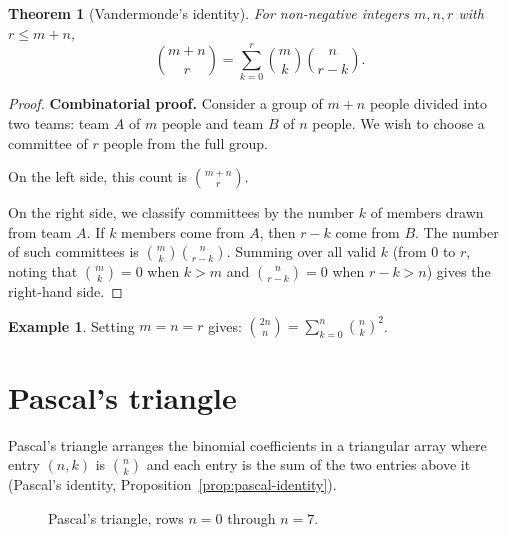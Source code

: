 \documentclass[12pt,a4paper,openany]{book}
\theoremstyle{definition}
\newtheorem{example}[definition]{Example}
\theoremstyle{plain}
\newtheorem{theorem}[definition]{Theorem}
\theoremstyle{remark}
\begin{document}
\begin{theorem}[Vandermonde's identity]\label{thm:vandermonde}
For non-negative integers $m, n, r$ with $r \leq m + n$,
\[
  \binom{m+n}{r} = \sum_{k=0}^{r} \binom{m}{k}\binom{n}{r-k}.
\]
\end{theorem}

\begin{proof}
\textbf{Combinatorial proof.}\; Consider a group of $m + n$ people divided
into two teams: team $A$ of $m$ people and team $B$ of $n$ people. We wish to
choose a committee of $r$ people from the full group.

On the left side, this count is $\binom{m+n}{r}$.

On the right side, we classify committees by the number $k$ of members drawn
from team $A$. If $k$ members come from $A$, then $r - k$ come from $B$.
The number of such committees is $\binom{m}{k}\binom{n}{r-k}$. Summing over
all valid $k$ (from $0$ to $r$, noting that $\binom{m}{k} = 0$ when $k > m$
and $\binom{n}{r-k} = 0$ when $r - k > n$) gives the right-hand side.
\end{proof}

\begin{example}\label{ex:vandermonde-special}
Setting $m = n = r$ gives:
$\displaystyle\binom{2n}{n} = \sum_{k=0}^{n} \binom{n}{k}^2$.
\end{example}

\section{Pascal's triangle}
\label{sec:pascal-triangle}

Pascal's triangle arranges the binomial coefficients
in a triangular array where entry $(n, k)$ is $\binom{n}{k}$ and each entry
is the sum of the two entries above it (Pascal's identity,
Proposition~\ref{prop:pascal-identity}).

\begin{figure}[ht]
\centering
{}
\caption{Pascal's triangle, rows $n = 0$ through $n = 7$.}
\label{fig:pascal-triangle}
\end{figure}
\end{document}
